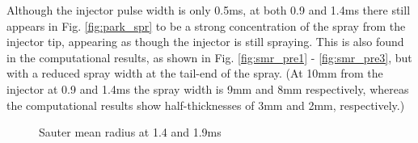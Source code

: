 \documentclass[a4paper,10pt]{article}
\begin{document}
Although the injector pulse width is only 0.5ms, at both 0.9 and 1.4ms there still appears in Fig. \ref{fig:park_spr} to be a strong concentration of the spray from the injector tip, appearing as though the injector is still spraying. This is also found in the computational results, as shown in Fig. \ref{fig:smr_pre1} - \ref{fig:smr_pre3}, but with a reduced spray width at the tail-end of the spray. (At 10mm from the injector at 0.9 and 1.4ms the spray width is 9mm and 8mm respectively, whereas the computational results show half-thicknesses of 3mm and 2mm, respectively.)
%
\begin{figure}[H]
\centering
{}
\caption{Sauter mean radius at 1.4 and 1.9ms}
\label{fig:smr_pre2}
\end{figure}
\end{document}
